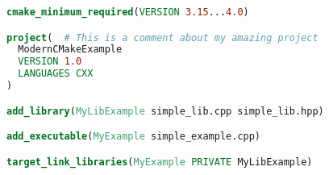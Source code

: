 \documentclass{article}
\begin{document}
\begin{lstlisting}[language=CMake]
cmake_minimum_required(VERSION 3.15...4.0)

project(  # This is a comment about my amazing project
  ModernCMakeExample
  VERSION 1.0
  LANGUAGES CXX
)

add_library(MyLibExample simple_lib.cpp simple_lib.hpp)

add_executable(MyExample simple_example.cpp)

target_link_libraries(MyExample PRIVATE MyLibExample)
\end{lstlisting}
\end{document}
